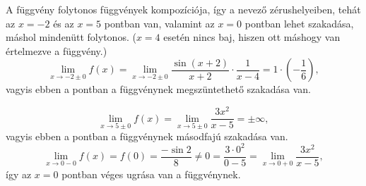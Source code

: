 \documentclass[11pt]{scrartcl}
\begin{document}
A függvény folytonos függvények kompozíciója, így a nevező zérushelyeiben,
tehát az $x = -2$ és az $x = 5$ pontban van, valamint az $x = 0$ pontban lehet
szakadása, máshol mindenütt folytonos. ($x = 4$ esetén nincs
baj, hiszen ott máshogy van értelmezve a függvény.)
\[
	\lim_{x \to -2 \pm 0} f(x)
	= \lim_{x \to -2 \pm 0} \frac{\sin(x + 2)}{x + 2} \cdot \frac{1}{x - 4}
	= 1 \cdot \left( -\frac{1}{6} \right),
\]
vagyis ebben a pontban a függvénynek megszüntethető szakadása van.

\[
	\lim_{x \to 5 \pm 0} f(x)
	= \lim_{x \to 5 \pm 0} \frac{3x^2}{x - 5}
	= \pm \infty,
\]
vagyis ebben a pontban a függvénynek másodfajú szakadása van.
\[
	\lim_{x \to 0 - 0} f(x)
	= f(0)
	= \frac{-\sin 2}{8}
	\ne 0
	= \frac{3 \cdot 0^2}{0 - 5}
	= \lim_{x \to 0 + 0} \frac{3x^2}{x - 5},
\]
így az $x = 0$ pontban véges ugrása van a függvénynek.
\end{document}
